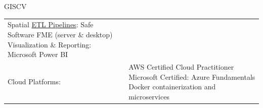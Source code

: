 \documentclass[letterpaper]{article}
\newenvironment{skillslist}
        {
            \hspace*{-0.07in}\begin{tabular}[t]{ l L{5.17in} }
        }{
            \end{tabular}
        }
\newcommand{\impt}[1]{\uline{#1}}
\begin{document}
\begin{taggedblock}{GISCV}
\begin{skillslist}
                Spatial \impt{ETL Pipelines}: Safe Software FME (server \& desktop) \linebreak
                Visualization \& Reporting: Microsoft Power BI \linebreak
                \\
            Cloud Platforms:&
                AWS Certified Cloud Practitioner \linebreak
                Microsoft Certified: Azure Fundamentals \linebreak
                Docker containerization and microservices \linebreak
                \\
        \end{skillslist}
    \end{taggedblock}
\end{document}
